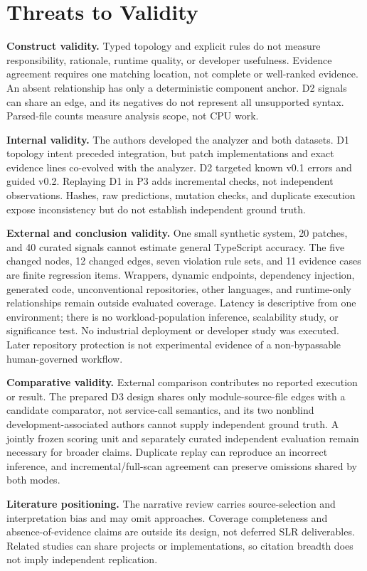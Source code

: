 \documentclass[conference]{IEEEtran}
\begin{document}
\section{Threats to Validity}
\textbf{Construct validity.} Typed topology and explicit rules do not measure responsibility, rationale, runtime quality, or developer usefulness. Evidence agreement requires one matching location, not complete or well-ranked evidence. An absent relationship has only a deterministic component anchor. D2 signals can share an edge, and its negatives do not represent all unsupported syntax. Parsed-file counts measure analysis scope, not CPU work.

\textbf{Internal validity.} The authors developed the analyzer and both datasets. D1 topology intent preceded integration, but patch implementations and exact evidence lines co-evolved with the analyzer. D2 targeted known v0.1 errors and guided v0.2. Replaying D1 in P3 adds incremental checks, not independent observations. Hashes, raw predictions, mutation checks, and duplicate execution expose inconsistency but do not establish independent ground truth.

\textbf{External and conclusion validity.} One small synthetic system, 20 patches, and 40 curated signals cannot estimate general TypeScript accuracy. The five changed nodes, 12 changed edges, seven violation rule sets, and 11 evidence cases are finite regression items. Wrappers, dynamic endpoints, dependency injection, generated code, unconventional repositories, other languages, and runtime-only relationships remain outside evaluated coverage. Latency is descriptive from one environment; there is no workload-population inference, scalability study, or significance test. No industrial deployment or developer study was executed. Later repository protection is not experimental evidence of a non-bypassable human-governed workflow.

\textbf{Comparative validity.} External comparison contributes no reported execution or result. The prepared D3 design shares only module-source-file edges with a candidate comparator, not service-call semantics, and its two nonblind development-associated authors cannot supply independent ground truth. A jointly frozen scoring unit and separately curated independent evaluation remain necessary for broader claims. Duplicate replay can reproduce an incorrect inference, and incremental/full-scan agreement can preserve omissions shared by both modes.

\textbf{Literature positioning.} The narrative review carries source-selection and interpretation bias and may omit approaches. Coverage completeness and absence-of-evidence claims are outside its design, not deferred SLR deliverables. Related studies can share projects or implementations, so citation breadth does not imply independent replication.
\end{document}
